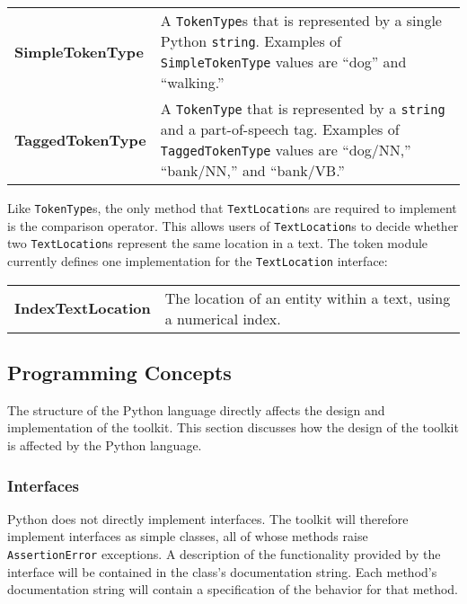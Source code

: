 \documentclass{article}
\begin{document}
\vspace{1.2mm}\noindent
\begin{tabular}{||p{}p{}}
  \textbf{SimpleTokenType} & A \texttt{TokenType}s that is
  represented by a single Python \texttt{string}.  Examples of
  \texttt{SimpleTokenType} values are ``dog'' and ``walking.'' \\

  \textbf{TaggedTokenType} & A \texttt{TokenType} that is
  represented by a \texttt{string} and a part-of-speech tag.  Examples 
  of \texttt{TaggedTokenType} values are ``dog/NN,'' ``bank/NN,'' and
  ``bank/VB.'' \\
\end{tabular}
\vspace{1mm}

Like \texttt{TokenType}s, the only method that \texttt{TextLocation}s
are required to implement is the comparison operator.  This allows
users of \texttt{TextLocation}s to decide whether two
\texttt{TextLocation}s represent the same location in a text.  The
token module currently defines one implementation for the
\texttt{TextLocation} interface:

\vspace{1.2mm}\noindent
\begin{tabular}{||p{}p{}}
  \textbf{IndexTextLocation} & The location of an
  entity within a text, using a numerical index. \\
\end{tabular}
\vspace{1mm}

\subsection{Programming Concepts}

The structure of the Python language directly affects the design and
implementation of the toolkit.  This section discusses how the design
of the toolkit is affected by the Python language.

\subsubsection{Interfaces}

Python does not directly implement interfaces.  The toolkit will
therefore implement interfaces as simple classes, all of whose methods 
raise \texttt{AssertionError} exceptions.  A description of the
functionality provided by the interface will be contained in the
class's documentation string.  Each method's documentation string will 
contain a specification of the behavior for that method.
\end{document}
